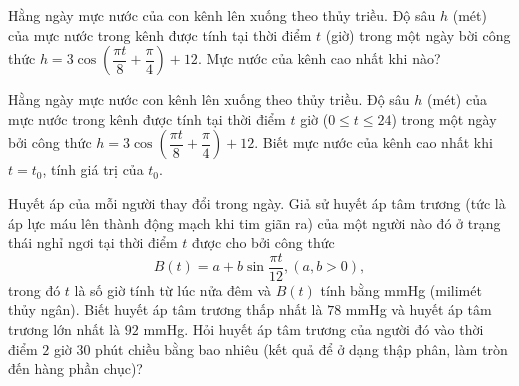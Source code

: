\begin{ex}%
	Hằng ngày mực nước của con kênh lên xuống theo thủy triều. Độ sâu $h$ (mét) của mực nước trong kênh được tính tại thời điểm $t$ (giờ) trong một ngày bời công thức $h=3 \cos \left(\dfrac{\pi t}{8}+\dfrac{\pi}{4}\right)+12$.  Mực nước của kênh cao nhất khi nào?
\end{ex}

\begin{ex}%
	Hằng ngày mực nước con kênh lên xuống theo thủy triều. Độ sâu $ h$ (mét) của mực nước trong kênh được tính tại thời điểm $t$ giờ ($0\le t\le24$) trong một ngày bởi công thức $ h=3\cos\left(\dfrac{\pi t}{8}+\dfrac{\pi}{4}\right)+12$. Biết mực nước của kênh cao nhất khi $t=t_0$, tính  giá trị của $t_0$.
\end{ex}

\begin{ex}%
	Huyết áp của mỗi người thay đổi trong ngày. Giả sử huyết áp tâm trương (tức là áp lực máu lên thành động mạch khi tim giãn ra) của một  người nào đó ở trạng thái nghỉ ngơi tại thời điểm $t$ được cho bởi công thức
	$$ 
	B(t)=a+b \sin \dfrac{\pi  t}{12}, (a, b>0),
	 $$
	trong đó $t$ là số giờ tính từ lúc nửa đêm và $B(t)$ tính bằng mmHg (milimét thủy ngân). Biết huyết áp tâm trương thấp nhất là $78$ mmHg và huyết áp tâm trương  lớn nhất là $92$ mmHg. Hỏi huyết áp tâm trương của người đó vào thời điểm $2$ giờ $30$ phút chiều bằng bao nhiêu (kết quả để ở dạng thập phân, làm tròn đến hàng phần chục)?
\end{ex}

